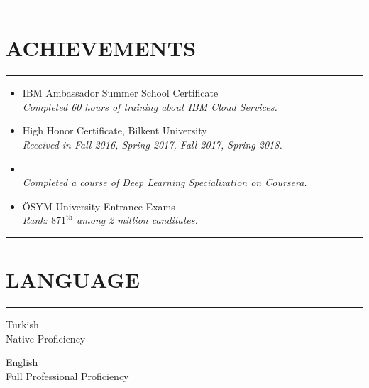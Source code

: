 \documentclass[11 pt, a4paper, usenames, dvipsnames]{article}
\newcommand*{\AchFont}{%
      \fontsize{10}{4}%
\color{Gray}%
\it
      \selectfont}
\newcommand*{\SectionFont}{%
      \fontsize{16}{5}%
\color{BrickRed}%
\bf
      \selectfont}
\begin{document}
\begin{paracol}{2}
\par\noindent\rule{0.26\textwidth}{0.4pt}\vspace{-12pt}
\section*{\SectionFont\faTrophy\enskip ACHIEVEMENTS}\vspace{-15pt}
\par\noindent\rule{0.26\textwidth}{0.4pt}

\begin{itemize}[leftmargin=0pt,align=left,labelwidth=\parindent,labelsep=0pt]
\item[]{IBM Ambassador Summer School Certificate}\\
{\AchFont Completed 60 hours of training about IBM Cloud Services.}

\item[]{High Honor Certificate, Bilkent University} \\
{\AchFont Received in  Fall 2016, Spring 2017, Fall 2017, Spring 2018.}

\item[] \\
{\AchFont Completed a course of Deep Learning Specialization on Coursera.}

\item[]{\"{O}SYM University Entrance Exams}\\
{\AchFont  Rank: $871^{\text{th}}$ among 2 million canditates.}
\end {itemize}

\par\noindent\rule{0.22\textwidth}{0.4pt}\vspace{-12pt}
\section*{\SectionFont\faMortarBoard\enskip LANGUAGE}\vspace{-15pt}
\par\noindent\rule{0.22\textwidth}{0.4pt}
\vspace{-1em}
\begin{itemize}[leftmargin=0pt,align=left,labelwidth=\parindent,labelsep=0pt]
\setlength{\columnsep}{1em}
\begin{multicols}{2}
\item[] {Turkish} \\
{\color{BrickRed} Native Proficiency}
\switchcolumn[1]
\item[] {English} \\
{\color{BrickRed} Full Professional Proficiency}
\end{multicols}
\end{itemize}


\end{paracol}
\end{document}
